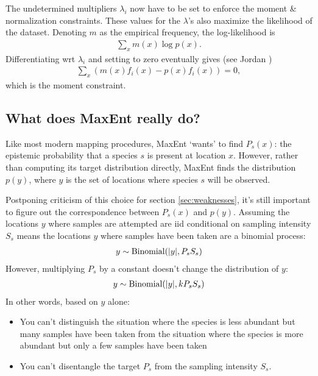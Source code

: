 \smallskip
The undetermined multipliers $\lambda_i$ now have to be set to enforce the moment \& normalization constraints. These values for the $\lambda$'s also maximize the likelihood of the dataset. Denoting $m$ as the empirical frequency, the log-likelihood is
\begin{eqnarray*}
    \sum_x m(x) \log p(x).
\end{eqnarray*}
Differentiating wrt $\lambda_i$ and setting to zero eventually gives (see Jordan \cite{Jordan:ch8}) 
\begin{eqnarray*}
    \sum_x \left(m(x) f_i(x) - p(x)f_i(x)\right) = 0,
\end{eqnarray*}
which is the moment constraint.

\subsection{What does MaxEnt really do?} 

Like most modern mapping procedures, MaxEnt `wants' to find $P_s(x)$: the epistemic probability that a species $s$ is present at location $x$. However, rather than computing its target distribution directly, MaxEnt finds the distribution $p(y)$, where $y$ is the set of locations where species $s$ will be observed. 

Postponing criticism of this choice for section \ref{sec:weaknesses}, it's still important to figure out the correspondence between $P_s(x)$ and $p(y)$. Assuming the locations $y$ where samples are attempted are iid conditional on sampling intensity $S_s$ means the locations $y$ where samples have been taken are a binomial process:
\begin{eqnarray*}
    y\sim \textup{Binomial}(|y|, P_s S_s) 
\end{eqnarray*}
However, multiplying $P_s$ by a constant doesn't change the distribution of $y$:
\begin{eqnarray*}
    y\sim \textup{Binomial}(|y|, k P_s S_s)
\end{eqnarray*}
In other words, based on $y$ alone: 
\begin{itemize}
    \item You can't distinguish the situation where the species is less abundant but many samples have been taken from the situation where the species is more abundant but only a few samples have been taken
    \item You can't disentangle the target $P_s$ from the sampling intensity $S_s$.
\end{itemize}

